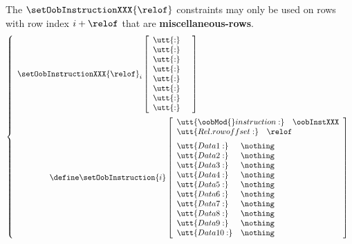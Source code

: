 \saNote{} The $\setOobInstructionXXX{\relof}$ constraints may only be used on rows with row index $i + \relof$ that are \textbf{miscellaneous-rows}.
\[
        \left\{ \begin{array}{l}
                \setOobInstructionXXX {\relof} _{i}
                \left[ \begin{array}{ll}
                        \utt{:} &  \\
                        \utt{:} &  \\
                        \utt{:} &  \\
                        \utt{:} &  \\
                        \utt{:} &  \\
                        \utt{:} &  \\
                        \utt{:} &  \\
                        \utt{:} &  \\
                \end{array} \right] \vspace{2mm} \\
                \qquad \qquad \define
                \setOobInstruction{i}
                \left[ \begin{array}{llr}
                        \multicolumn{3}{l}{\utt{\oobMod{} instruction:} \quad \oobInstXXX} \\
                        \multicolumn{3}{l}{\utt{Rel. row offset:}            \quad \relof}         \vspace{2mm} \\
                        \utt{Data 1:}  & \nothing \\
                        \utt{Data 2:}  & \nothing \\
                        \utt{Data 3:}  & \nothing \\
                        \utt{Data 4:}  & \nothing \\
                        \utt{Data 5:}  & \nothing \\
                        \utt{Data 6:}  & \nothing \\
                        \utt{Data 7:}  & \nothing \\
                        \utt{Data 8:}  & \nothing \\
                        \utt{Data 9:}  & \nothing \\
                        \utt{Data 10:} & \nothing \\
                \end{array} \right] \\
        \end{array} \right.
\]
